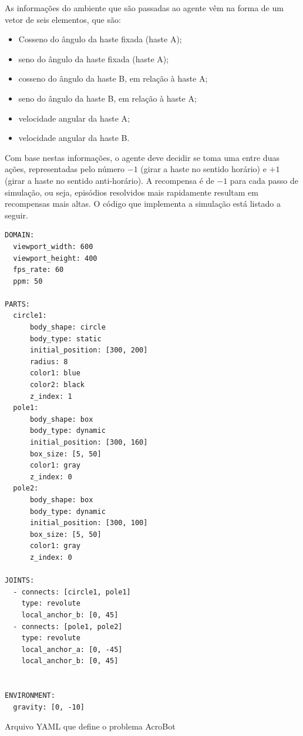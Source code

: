 \documentclass[cic,tc]{iiufrgs}
\newenvironment{longlisting}{\captionsetup{type=listing}}{}
\begin{document}
As informações do ambiente que são passadas ao agente vêm na forma de um vetor de
seis elementos, que são:

\begin{itemize}
  \item Cosseno do ângulo da haste fixada (haste A);
  \item seno do ângulo da haste fixada (haste A);
  \item cosseno do ângulo da haste B, em relação à haste A;
  \item seno do ângulo da haste B, em relação à haste A;
  \item velocidade angular da haste A;
  \item velocidade angular da haste B.
\end{itemize}

Com base nestas informações, o agente deve decidir se toma uma entre duas ações,
representadas pelo número $-1$ (girar a haste no sentido horário) e $+1$ (girar a
haste no sentido anti-horário). A recompensa é de $-1$ para cada passo de simulação,
ou seja, episódios resolvidos mais rapidamente resultam em recompensas mais altas.
O código que implementa a simulação está listado a seguir.



\begin{longlisting}
\begin{verbatim}
DOMAIN:
  viewport_width: 600
  viewport_height: 400
  fps_rate: 60
  ppm: 50

PARTS:
  circle1:
      body_shape: circle
      body_type: static
      initial_position: [300, 200]
      radius: 8
      color1: blue
      color2: black
      z_index: 1
  pole1:
      body_shape: box
      body_type: dynamic
      initial_position: [300, 160]
      box_size: [5, 50]
      color1: gray
      z_index: 0
  pole2:
      body_shape: box
      body_type: dynamic
      initial_position: [300, 100]
      box_size: [5, 50]
      color1: gray
      z_index: 0

JOINTS:
  - connects: [circle1, pole1]
    type: revolute
    local_anchor_b: [0, 45]
  - connects: [pole1, pole2]
    type: revolute
    local_anchor_a: [0, -45]
    local_anchor_b: [0, 45]


ENVIRONMENT:
  gravity: [0, -10]
\end{verbatim}
\caption[Cópia de DNA]{Arquivo YAML que define o problema AcroBot}
\label{source:acrobot_yaml}
\end{longlisting}
\end{document}
